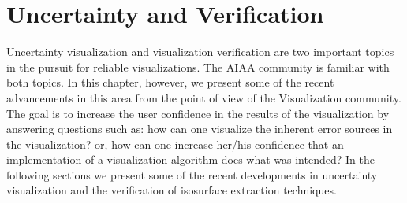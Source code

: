 

\section{Uncertainty and Verification}
\label{sec:verif}

Uncertainty visualization  and  visualization verification  are two important topics in the pursuit for reliable visualizations. 
The AIAA community is  familiar with both topics. In this chapter, however, we present some of the recent advancements in this area from the point of view of the Visualization community. The goal is to increase the user confidence in the results of the visualization by answering questions such as: how can one visualize the inherent error sources in the visualization? or, how can one increase her/his confidence that an implementation of a visualization algorithm  does what was intended? In the following sections we present some of the recent developments in uncertainty visualization and the verification of isosurface extraction techniques.



